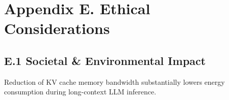 \section{Appendix E. Ethical Considerations}
\subsection{E.1 Societal & Environmental Impact}
Reduction of KV cache memory bandwidth substantially lowers energy consumption during long-context LLM inference.
